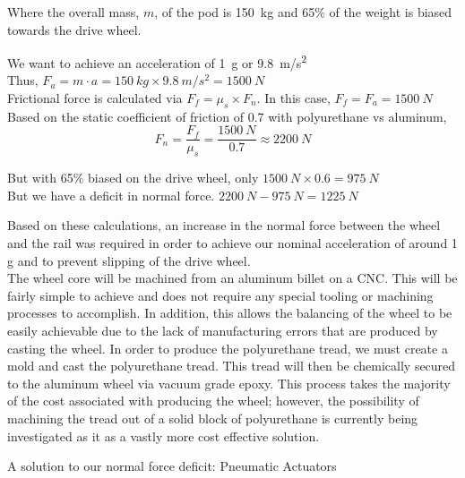 \documentclass[main.tex]{subfiles}
\begin{document}
    Where the overall mass, $m$, of the pod is \SI{150}{kg} and 65\% of the weight is biased towards the drive wheel.

    \begin{center}
        We want to achieve an acceleration of \SI{1}{g} or \SI{9.8}{m/s^2}\\

        Thus, $F_a=m\cdot a = \SI{150}{kg} \times \SI{9.8}{m/s^2} = \SI{1500}{N}$\\

        Frictional force is calculated via $F_f=\mu_s \times F_n$. In this case, $F_f=F_a=\SI{1500}{N}$\\

        Based on the static coefficient of friction of 0.7 with polyurethane vs aluminum,
        \[
        F_n = \frac{F_f}{\mu_s} = \frac{\SI{1500}{N}}{0.7} \approx \SI{2200}{N}
        \]

        But with 65\% biased on the drive wheel, only $\SI{1500}{N} \times 0.6 = \SI{975}{N}$\\

        But we have a deficit in normal force. $\SI{2200}{N} -\SI{975}{N}=\SI{1225}{N}$
    \end{center}
    Based on these calculations, an increase in the normal force between the wheel and the rail was required in order to achieve our nominal acceleration of around 1 g and to prevent slipping of the drive wheel.\\

    The wheel core will be machined from an aluminum billet on a CNC. This will be fairly simple to achieve and does not require any special tooling or machining processes to accomplish. In addition, this allows the balancing of the wheel to be easily achievable due to the lack of manufacturing errors that are produced by casting the wheel. In order to produce the polyurethane tread, we must create a mold and cast the polyurethane tread. This tread will then be chemically secured to the aluminum wheel via vacuum grade epoxy. This process takes the majority of the cost associated with producing the wheel; however, the possibility of machining the tread out of a solid block of polyurethane is currently being investigated as it as a vastly more cost effective solution.

    A solution to our normal force deficit: Pneumatic Actuators\\
\end{document}
